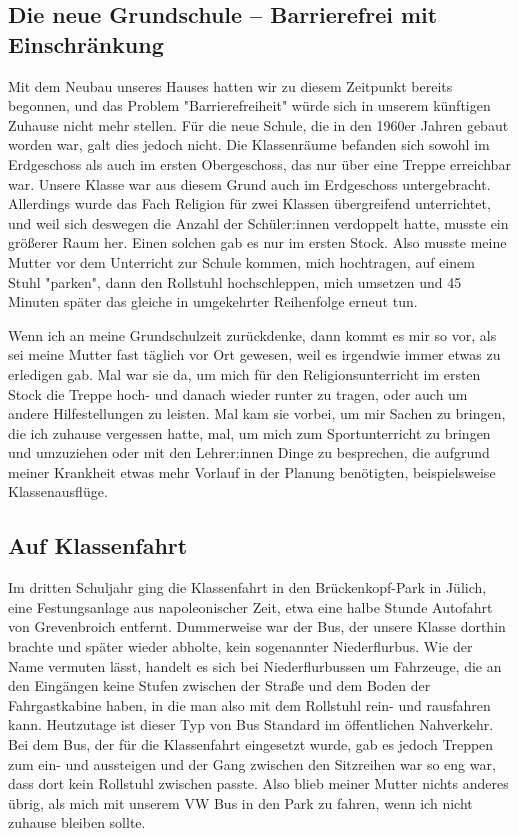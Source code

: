 \documentclass[fontsize=14pt,a4paper,headinclude,DIV=calc,automark]{scrbook}
\begin{document}
\subsection{Die neue Grundschule – Barrierefrei mit Einschränkung}

Mit dem Neubau unseres Hauses hatten wir zu diesem Zeitpunkt bereits begonnen, und das Problem "Barrierefreiheit" würde sich in unserem künftigen Zuhause nicht mehr stellen. Für die neue Schule, die in den 1960er Jahren gebaut worden war, galt dies jedoch nicht. Die Klassenräume befanden sich sowohl im Erdgeschoss als auch im ersten Obergeschoss, das nur über eine Treppe erreichbar war. Unsere Klasse war aus diesem Grund auch im Erdgeschoss untergebracht. Allerdings wurde das Fach Religion für zwei Klassen übergreifend unterrichtet, und weil sich deswegen die Anzahl der Schüler:innen verdoppelt hatte, musste ein größerer Raum her. Einen solchen gab es nur im ersten Stock. Also musste meine Mutter vor dem Unterricht zur Schule kommen, mich hochtragen, auf einem Stuhl "parken", dann den Rollstuhl hochschleppen, mich umsetzen und 45 Minuten später das gleiche in umgekehrter Reihenfolge erneut tun.

Wenn ich an meine Grundschulzeit zurückdenke, dann kommt es mir so vor, als sei meine Mutter fast täglich vor Ort gewesen, weil es irgendwie immer etwas zu erledigen gab. Mal war sie da, um mich für den Religionsunterricht im ersten Stock die Treppe hoch- und danach wieder runter zu tragen, oder auch um andere Hilfestellungen zu leisten. Mal kam sie vorbei, um mir Sachen zu bringen, die ich zuhause vergessen hatte, mal, um mich zum Sportunterricht zu bringen und umzuziehen oder mit den Lehrer:innen Dinge zu besprechen, die aufgrund meiner Krankheit etwas mehr Vorlauf in der Planung benötigten, beispielsweise Klassenausflüge.

\subsection{Auf Klassenfahrt}

Im dritten Schuljahr ging die Klassenfahrt in den Brückenkopf-Park in Jülich, eine Festungsanlage aus napoleonischer Zeit, etwa eine halbe Stunde Autofahrt von Grevenbroich entfernt. Dummerweise war der Bus, der unsere Klasse dorthin brachte und später wieder abholte, kein sogenannter Niederflurbus. Wie der Name vermuten lässt, handelt es sich bei Niederflurbussen um Fahrzeuge, die an den Eingängen keine Stufen zwischen der Straße und dem Boden der Fahrgastkabine haben, in die man also mit dem Rollstuhl rein- und rausfahren kann. Heutzutage ist dieser Typ von Bus Standard im öffentlichen Nahverkehr. Bei dem Bus, der für die Klassenfahrt eingesetzt wurde, gab es jedoch Treppen zum ein- und aussteigen und der Gang zwischen den Sitzreihen war so eng war, dass dort kein Rollstuhl zwischen passte. Also blieb meiner Mutter nichts anderes übrig, als mich mit unserem VW Bus in den Park zu fahren, wenn ich nicht zuhause bleiben sollte.
\end{document}
